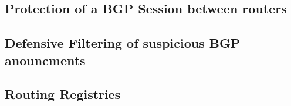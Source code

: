 \documentclass[12pt]{IEEEtran}
\begin{document}
	\subsection{Protection of a BGP Session between routers}
%
%					
%
%				
%				
%			
%
%
	\subsection{Defensive Filtering of suspicious BGP anouncments}
%				

	\subsection{Routing Registries}
%			
			
\end{document}
